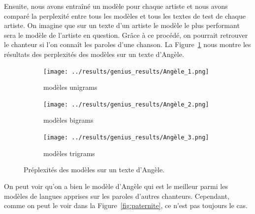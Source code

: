 \documentclass[a4paper]{article}
\begin{document}
Ensuite, nous avons entraîné un modèle pour chaque artiste et nous avons comparé la perplexité entre tous les
modèles et tous les textes de test de chaque artiste. On imagine que sur un texte d'un artiste le modèle le plus
performant sera le modèle de l'artiste en question. Grâce à ce procédé, on pourrait retrouver le chanteur si l'on connaît
les paroles d'une chanson. La Figure~\ref{fig:Angele} nous montre les résultats des perplexités des modèles sur un texte d'Angèle.

\begin{figure}[!ht]
    \begin{subfigure}{0.32\textwidth}
        \centering
        \texttt{[image: ../results/genius\_results/Angèle\_1.png]}
        \caption{modèles unigrams}
    \end{subfigure}
    \hfill
    \begin{subfigure}{0.32\textwidth}
        \centering
        \texttt{[image: ../results/genius\_results/Angèle\_2.png]}
        \caption{modèles bigrams}
    \end{subfigure}
    \hfill
    \begin{subfigure}{0.32\textwidth}
        \centering
        \texttt{[image: ../results/genius\_results/Angèle\_3.png]}
        \caption{modèles trigrams}
    \end{subfigure}
    \hfill
    \caption{Préplexités des modèles sur un texte d'Angèle.}
    \label{fig:Angele}
\end{figure}

On peut voir qu'on a bien le modèle d'Angèle qui est le meilleur parmi les modèles de langues apprises sur les paroles d'autres chanteurs.
Cependant, comme on peut le voir dans la Figure~\ref{fig:paternite}, ce n'est pas toujours le cas.
\end{document}
